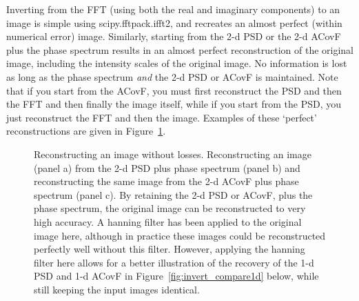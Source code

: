 \documentclass[11pt,preprint]{aastex}
\begin{document}
Inverting from the FFT (using both the real and imaginary components) to an image is simple using scipy.fftpack.ifft2, and recreates an almost perfect (within numerical error) image. Similarly, starting from the 2-d PSD or the 2-d ACovF plus the phase spectrum results in an almost perfect reconstruction of the original image, including the intensity scales of the original image. No information is lost as long as the phase spectrum {\it and} the 2-d PSD or ACovF is maintained. Note that if you start from the ACovF, you must first reconstruct the PSD and then the FFT and then finally the image itself, while if you start from the PSD, you just reconstruct the FFT and then the image. Examples of these `perfect' reconstructions are given in Figure~\ref{fig:invert_perfect}. 

\begin{figure}[htpb]
\centering
{}
\caption{{\small
Reconstructing an image without losses. Reconstructing an image (panel a) from the 2-d PSD plus phase spectrum (panel b) and reconstructing the same image from the 2-d ACovF plus phase spectrum (panel c). By retaining the 2-d PSD or ACovF, plus the phase spectrum, the original image can be reconstructed to very high accuracy.  A hanning filter has been applied to the original image here, although in practice these images could be reconstructed perfectly well without this filter. However, applying the hanning filter here allows for a better illustration of the recovery of the 1-d PSD and 1-d ACovF in Figure~\ref{fig:invert_compare1d} below, while still keeping the input images identical.}}
\label{fig:invert_perfect}
\end{figure}
\end{document}
